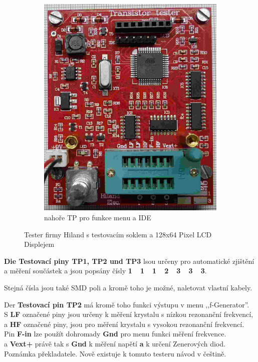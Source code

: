 \begin{figure}[H]
\begin{subfigure}[b]{.5\textwidth}
    \includegraphics[width=.756\textwidth]{../PNG/Hi_o.jpg}
    \caption{nahoře TP pro funkce menu a IDE}
  \end{subfigure}
  \caption{Tester firmy Hiland s testovacím soklem a 128x64 Pixel LCD Displejem}
  \label{fig:Hiland}
\end{figure}

{\textbf {Die Testovací piny TP1, TP2 und TP3}} lsou určeny pro automatické zjištění a měření
součástek a jsou popsány čísly {\textbf {1~~1~~1~~2~~3~~3~~3}}.

Stejná čísla jsou také SMD poli a kromě toho je možné, naletovat vlastní kabely.

Der \textbf {Testovací pin TP2} má kromě toho funkci výstupu v menu ,,f-Generator''.
\\S \textbf{ LF} označené piny jsou určeny k měření krystalu s nízkou rezonanční frekvencí,
\\a \textbf{ HF} označené piny, jsou pro měření krystalu s vysokou rezonanční frekvencí.
\\
Pin \textbf {F-in} lze použít dohromady {\textbf {Gnd}} pro menu funkci měření frekvence.
\\a \textbf {Vext+} právě tak s {\textbf {Gnd}} k měření napětí {\textbf a} k určení Zenerových diod.\\

Poznámka překladatele. Nově existuje k tomuto testeru návod v češtině.

